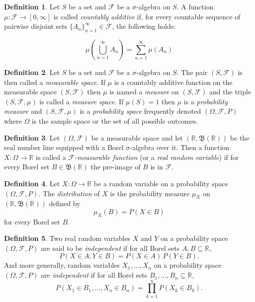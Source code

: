 \documentclass[12pt]{article}
\theoremstyle{definition}
\newtheorem{definition}{Definition}[section]
\theoremstyle{plain}
\theoremstyle{remark}
\begin{document}
\begin{definition}
Let $S$ be a set and $\mathcal{F}$ be a $\sigma$-algebra on $S$.  A function $\mu: \mathcal{F} \to [0,\infty] $ is called 
\textit{countably additive} if, for every countable sequence of pairwise disjoint sets $\{A_n \}_{n=1}^{\infty} \in \mathcal{F}$, the following holds:

\[
    \mu \left( \bigcup_{n=1}^\infty A_n \right) = \sum_{n=1}^\infty \mu \left( A_n \right)
\]

\end{definition}

\begin{definition}
Let $S$ be a set and $\mathcal{F}$ be a $\sigma$-algebra on $S$.  The pair $(S, \mathcal{F})$ is then called a \textit{measurable space}.  If $\mu$ is a countably additive function on the measurable space  $(S, \mathcal{F})$ then $\mu$ is named a \textit{measure} on $(S, \mathcal{F})$ and the triple $(S,\mathcal{F},\mu)$ is called a \textit{measure space}.  If $\mu(S)=1$ then $\mu$ is a \textit{probability measure} and $(S,\mathcal{F},\mu)$ is a \textit{probability space} frequently denoted $(\Omega, \mathcal{F}, P)$ where $\Omega$ is the sample space or the set of all possible outcomes.
\end{definition}

\begin{definition}
Let $(\Omega, \mathcal{F})$ be a measurable space and let $(\mathbb{R},\mathfrak{B}(\mathbb{R}))$ be the real number line equipped with a Borel $\sigma$-algebra over it.  Then a function $X: \Omega \to \mathbb{R}$ is called a \textit{$\mathcal{F}$-measurable function} (or a \textit{real random variable}) if for every Borel set $B \in \mathfrak{B}(\mathbb{R})$ the pre-image of $B$ is in $\mathcal{F}$.

\end{definition}

\begin{definition}
Let $X:\Omega \to \mathbb{R}$ be a random variable on a probability space $(\Omega,\mathcal{F},P)$. The \textit{distribution} of $X$ is the probability measure $\mu_X$ on $(\mathbb{R},\mathfrak{B}(\mathbb{R}))$ defined by
\[
\mu_X(B)=P(X \in B)
\]
for every Borel set $B$.
\end{definition}

\begin{definition}
Two real random variables $X$ and $Y$ on a probability space $(\Omega,\mathcal{F},P)$ are said to be \textit{independent} if for all Borel sets $A,B \subseteq \mathbb{R}$,
\[
P(X \in A, Y \in B) = P(X \in A)\,P(Y \in B).
\]
And more generally, random variables $X_1,\dots,X_n$ on a probability space $(\Omega,\mathcal{F},P)$ are \textit{independent} if for all Borel sets $B_1,\dots,B_n \subseteq \mathbb{R}$,
\[
P(X_1 \in B_1,\dots,X_n \in B_n)
=
\prod_{k=1}^n P(X_k \in B_k).
\]
\end{definition}
\end{document}
